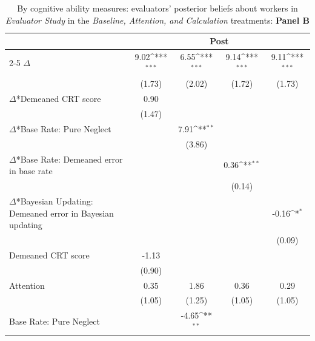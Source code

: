 \begin{table}[htbp]\centering
\def\sym#1{\ifmmode^{#1}\else\(^{#1}\)\fi}
\caption{By cognitive ability measures: evaluators' posterior beliefs about workers in \textit{Evaluator Study} in the \textit{Baseline, Attention, and Calculation} treatments: \textbf{Panel B}}
\begin{tabular}{l*{4}{c}}
\hline\hline
                &\multicolumn{4}{c}{Post}                                                   \\\cmidrule(lr){2-5}
\hline
$\Delta$        &     9.02\sym{***}&     6.55\sym{***}&     9.14\sym{***}&     9.11\sym{***}\\
                &   (1.73)         &   (2.02)         &   (1.72)         &   (1.73)         \\
$\Delta$*Demeaned CRT score&     0.90         &                  &                  &                  \\
                &   (1.47)         &                  &                  &                  \\
$\Delta$*Base Rate: Pure Neglect&                  &     7.91\sym{**} &                  &                  \\
                &                  &   (3.86)         &                  &                  \\
$\Delta$*Base Rate: Demeaned error in base rate&                  &                  &     0.36\sym{**} &                  \\
                &                  &                  &   (0.14)         &                  \\
$\Delta$*Bayesian Updating: Demeaned error in Bayesian updating&                  &                  &                  &    -0.16\sym{*}  \\
                &                  &                  &                  &   (0.09)         \\
Demeaned CRT score&    -1.13         &                  &                  &                  \\
                &   (0.90)         &                  &                  &                  \\
Attention       &     0.35         &     1.86         &     0.36         &     0.29         \\
                &   (1.05)         &   (1.25)         &   (1.05)         &   (1.05)         \\
Base Rate: Pure Neglect&                  &    -4.65\sym{**} &                  &                  \\

\end{tabular}
\end{table}
